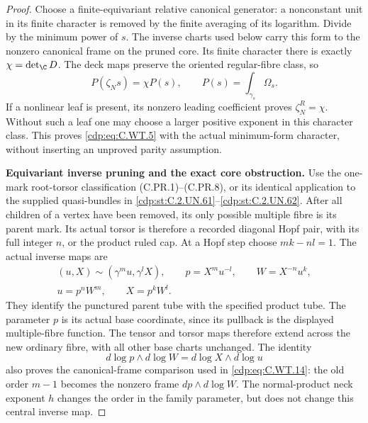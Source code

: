 \begin{proof}
Choose a finite-equivariant relative
canonical generator: a nonconstant unit
in its finite character is removed by
the finite averaging of its logarithm.
Divide by the minimum power of \(s\).
The inverse charts used below carry this
form to the nonzero canonical frame on
the pruned core. Its finite character
there is exactly \(\chi=\det_{\C}D\).
The deck maps preserve the oriented
regular-fibre class, so
\[
 P(\zeta_Ns)=\chi P(s),\qquad
 P(s)=\int_{\gamma_s}\Omega_s .
 \tag{C.WT.14}\label{cdp:eq:C.WT.14}
\]
If a nonlinear leaf is present, its
nonzero leading coefficient proves
\(\zeta_N^R=\chi\). Without such a leaf
one may choose a larger positive exponent
in this character class. This proves
\eqref{cdp:eq:C.WT.5} with the actual minimum-form
character, without inserting an
unproved parity assumption.

\par\medskip\noindent\textbf{Equivariant inverse pruning and the exact core obstruction.}
Use the one-mark root-torsor classification
(C.PR.1)--(C.PR.8), or its identical application
to the supplied quasi-bundles in \ref{cdp:st:C.2.UN.61}--\ref{cdp:st:C.2.UN.62}.
After all children of a vertex have been
removed, its only possible multiple fibre
is its parent mark. Its actual torsor is
therefore a recorded diagonal Hopf pair,
with its full integer \(n\), or the product
ruled cap. At a Hopf step choose
\(mk-nl=1\). The actual inverse maps are
\[
 \begin{gathered}
 (u,X)\sim(\gamma^m u,\gamma^lX),\qquad
 p=X^m u^{-l},\qquad W=X^{-n}u^k,\\
                       u=p^nW^m,\qquad X=p^kW^l.
 \end{gathered}
 \tag{C.WT.15}\label{cdp:eq:C.WT.15}
\]
They identify the punctured parent tube
with the specified product tube. The
parameter \(p\) is its actual base
coordinate, since its pullback is the
displayed multiple-fibre function.
The tensor and torsor maps therefore
extend across the new ordinary fibre,
with all other base charts unchanged.
The identity
\[
             d\log p\wedge d\log W
                         =d\log X\wedge d\log u
 \tag{C.WT.16}\label{cdp:eq:C.WT.16}
\]
also proves the canonical-frame comparison
used in \eqref{cdp:eq:C.WT.14}: the old order \(m-1\)
becomes the nonzero frame \(dp\wedge
d\log W\). The normal-product neck
exponent \(h\) changes the order in the
family parameter, but does not change
this central inverse map.


\end{proof}
